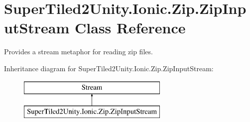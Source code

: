 \hypertarget{class_super_tiled2_unity_1_1_ionic_1_1_zip_1_1_zip_input_stream}{}\section{Super\+Tiled2\+Unity.\+Ionic.\+Zip.\+Zip\+Input\+Stream Class Reference}
\label{class_super_tiled2_unity_1_1_ionic_1_1_zip_1_1_zip_input_stream}


Provides a stream metaphor for reading zip files.  


Inheritance diagram for Super\+Tiled2\+Unity.\+Ionic.\+Zip.\+Zip\+Input\+Stream\+:\begin{figure}[H]
\begin{center}
\leavevmode
\includegraphics[height=2.000000cm]{class_super_tiled2_unity_1_1_ionic_1_1_zip_1_1_zip_input_stream}
\end{center}
\end{figure}

